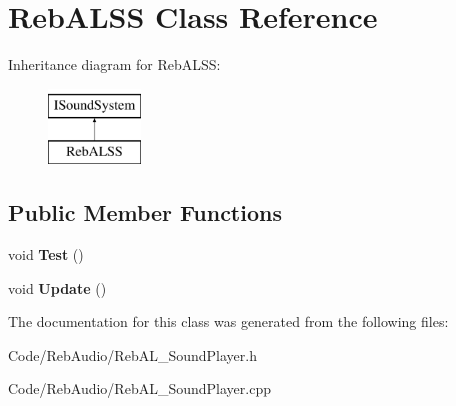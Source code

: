 \hypertarget{class_reb_a_l_s_s}{}\section{Reb\+A\+L\+SS Class Reference}
\label{class_reb_a_l_s_s}
Inheritance diagram for Reb\+A\+L\+SS\+:\begin{figure}[H]
\begin{center}
\leavevmode
\includegraphics[height=2.000000cm]{class_reb_a_l_s_s}
\end{center}
\end{figure}
\subsection*{Public Member Functions}
\begin{DoxyCompactItemize}
\item 
void {\bfseries Test} ()\hypertarget{class_reb_a_l_s_s_aa18aaf1660bf2c1b58b4bdd75b295a98}{}\label{class_reb_a_l_s_s_aa18aaf1660bf2c1b58b4bdd75b295a98}

\item 
void {\bfseries Update} ()\hypertarget{class_reb_a_l_s_s_a4f2b35c073e75d10a5d2d19ffc01d576}{}\label{class_reb_a_l_s_s_a4f2b35c073e75d10a5d2d19ffc01d576}

\end{DoxyCompactItemize}


The documentation for this class was generated from the following files\+:\begin{DoxyCompactItemize}
\item 
Code/\+Reb\+Audio/Reb\+A\+L\+\_\+\+Sound\+Player.\+h\item 
Code/\+Reb\+Audio/Reb\+A\+L\+\_\+\+Sound\+Player.\+cpp\end{DoxyCompactItemize}
